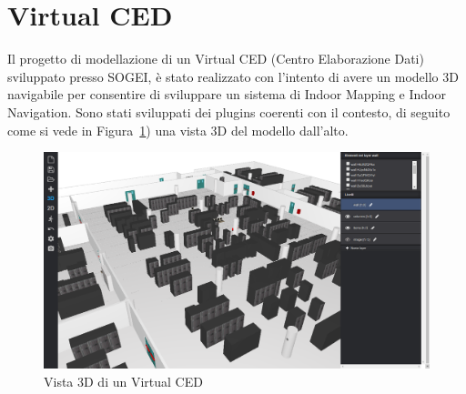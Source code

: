 \section{Virtual CED}
\label{sec:chapter_4_section_2}
Il progetto di modellazione di un Virtual CED (Centro Elaborazione Dati) sviluppato presso SOGEI, \`e stato realizzato con
l'intento di avere un modello 3D navigabile per consentire di sviluppare un sistema di Indoor Mapping e Indoor Navigation.
Sono stati sviluppati dei plugins coerenti con il contesto, di seguito come si vede in Figura~\ref{fig:virtualCED}) una
vista 3D del modello dall'alto.\\

\begin{figure}[htbp] %
   \centering
   \includegraphics[width=1\linewidth]{images/virtualCED}
   \caption{Vista 3D di un Virtual CED}
   \label{fig:virtualCED}
   \end{figure}

